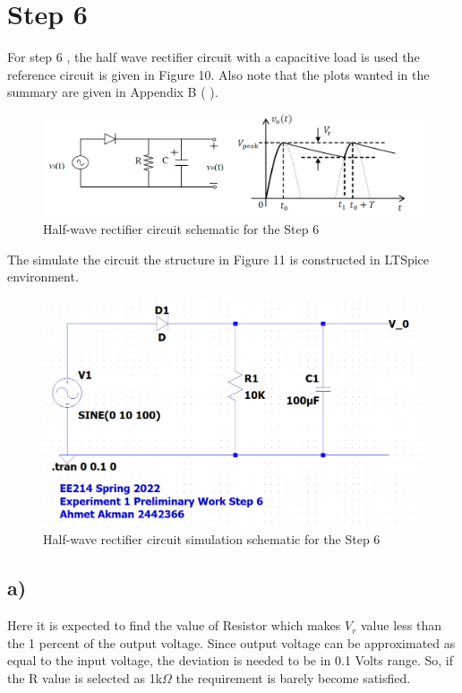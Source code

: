 \documentclass[letterpaper,12pt]{article}
\begin{document}
\section{Step 6}
For step 6 , the half wave rectifier circuit with a capacitive load is used the reference circuit is given in Figure 10. Also note that the plots wanted in the summary are given in Appendix B  ( \pageref{AB} ).
\begin{figure}[H]
    \centering
   \includegraphics[width=1\textwidth]{6_1.png}
   \caption{Half-wave rectifier circuit schematic for the Step 6}
\end{figure} 
The simulate the circuit the structure in Figure 11 is constructed in LTSpice environment.

\begin{figure}[H]
    \centering
   \includegraphics[width=1\textwidth]{6SCH.png}
   \caption{Half-wave rectifier circuit simulation schematic for the Step 6}
\end{figure} 



\subsection{a)}
Here it is expected to find the value of Resistor which makes \(V_r\) value less than the 1 percent of the output voltage. Since output voltage can be approximated as equal to the input voltage, the deviation is needed to be in 0.1 Volts range. So, if the R value is selected as 1k\(\Omega\)  the requirement is barely become satisfied. 
\end{document}
